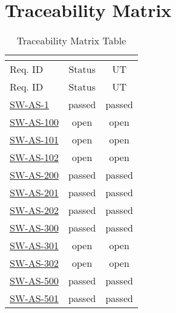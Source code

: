 


\chapter{Traceability Matrix}


\begin{longtable}{l c  c }
\caption{Traceability Matrix Table} \\
\label{tbl:tracematrix} \\
\toprule
Req. ID  & Status 
 & UT  \\
\midrule
\endfirsthead
\toprule
Req. ID  & Status 
 & UT  \\
\midrule
\endhead
\bottomrule
\endfoot
\bottomrule
\endlastfoot


\hyperref[SW-AS-1]{SW-AS-1} \label{trmat:SW-AS-1} & %
passed %
 & passed  %
 \\

\hyperref[SW-AS-100]{SW-AS-100} \label{trmat:SW-AS-100} & %
open %
 & open  %
 \\

\hyperref[SW-AS-101]{SW-AS-101} \label{trmat:SW-AS-101} & %
open %
 & open  %
 \\

\hyperref[SW-AS-102]{SW-AS-102} \label{trmat:SW-AS-102} & %
open %
 & open  %
 \\

\hyperref[SW-AS-200]{SW-AS-200} \label{trmat:SW-AS-200} & %
passed %
 & passed  %
 \\

\hyperref[SW-AS-201]{SW-AS-201} \label{trmat:SW-AS-201} & %
passed %
 & passed  %
 \\

\hyperref[SW-AS-202]{SW-AS-202} \label{trmat:SW-AS-202} & %
passed %
 & passed  %
 \\

\hyperref[SW-AS-300]{SW-AS-300} \label{trmat:SW-AS-300} & %
passed %
 & passed  %
 \\

\hyperref[SW-AS-301]{SW-AS-301} \label{trmat:SW-AS-301} & %
open %
 & open  %
 \\

\hyperref[SW-AS-302]{SW-AS-302} \label{trmat:SW-AS-302} & %
open %
 & open  %
 \\

\hyperref[SW-AS-500]{SW-AS-500} \label{trmat:SW-AS-500} & %
passed %
 & passed  %
 \\

\hyperref[SW-AS-501]{SW-AS-501} \label{trmat:SW-AS-501} & %
passed %
 & passed  %
 \\

\end{longtable}
